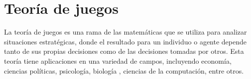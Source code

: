 \section{Teoría de juegos}\label{c26}

La teoría de juegos es una rama de las matemáticas que se utiliza para analizar situaciones estratégicas, donde el resultado para un individuo o agente depende tanto de sus propias decisiones como de las decisiones tomadas por otros. Esta teoría tiene aplicaciones en una variedad de campos, incluyendo economía, ciencias políticas, psicología, biología , ciencias de la computación, entre otros.
\vspace{2.5mm}

